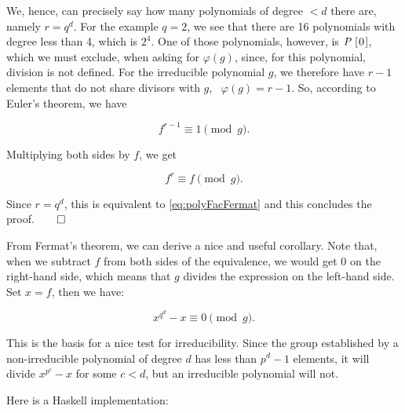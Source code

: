 \documentclass[tikz]{scrreprt}
\newcommand{\Conid}[1]{\mathit{#1}}
\begin{document}
We, hence, can precisely say how many polynomials 
of degree $<d$ there are, namely $r=q^d$.
For the example $q=2$, we see that there are 16 polynomials
with degree less than 4, which is $2^4$.
One of those polynomials, however, is \ensuremath{\Conid{P}\;[\mskip1.5mu \mathrm{0}\mskip1.5mu]},
which we must exclude, when asking for $\varphi(g)$,
since, for this polynomial, 
division is not defined.
For the irreducible polynomial $g$, we therefore
have $r-1$ elements that do not share divisors with $g$,
\ie\ $\varphi(g) = r-1$. So, according to Euler's theorem,
we have 

\begin{equation}
f^{r-1} \equiv 1 \pmod{g}. 
\end{equation}

Multiplying both sides by $f$, we get

\begin{equation}
f^{r} \equiv f \pmod{g}. 
\end{equation}

Since $r=q^d$, this is equivalent to \ref{eq:polyFacFermat}
and this concludes the proof.$\qed$

From Fermat's theorem, we can derive a nice and useful corollary.
Note that, when we subtract $f$ from both sides of the equivalence,
we would get 0 on the right-hand side, which means that
$g$ divides the expression on the left-hand side.
Set $x=f$, then we have:

\begin{equation}\label{eq:polyFacIrrTest}
x^{q^d} - x \equiv 0 \pmod{g}. 
\end{equation}

This is the basis for 
a nice test for irreducibility.
Since the group established by a non-irreducible
polynomial of degree $d$ has less than $p^d - 1$ elements,
it will divide $x^{p^c} - x$ for some $c<d$, but an irreducible
polynomial will not.
Here is a Haskell implementation:
\end{document}
